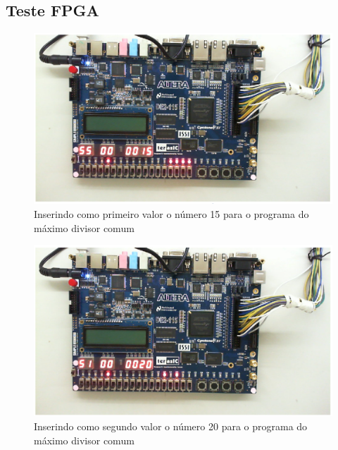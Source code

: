 \documentclass[
	12pt,				%
	oneside,
	a4paper,			%
	english,			%
	french,				%
	spanish,			%
	brazil,				%
	]{abntex2}
\begin{document}
\subsection{Teste FPGA}

\begin{figure}[H]
\centering 
\caption{Inserindo como primeiro valor o número 15 para o programa do máximo divisor comum} 
\label{fig:FPGAMDCEntrada1}
\graphicspath{ {./imgs/} } 
\includegraphics[scale=0.4]{imgs/Resultados/MDC_FPGA_Entrada2.png}
\end{figure}

\begin{figure}[H]
\centering 
\caption{Inserindo como segundo valor o número 20 para o programa do máximo divisor comum} 
\label{fig:FPGAMDCEntrada2}
\graphicspath{ {./imgs/} } 
\includegraphics[scale=0.4]{imgs/Resultados/MDC_FPGA_Entrada1.png}
\end{figure}
\end{document}
